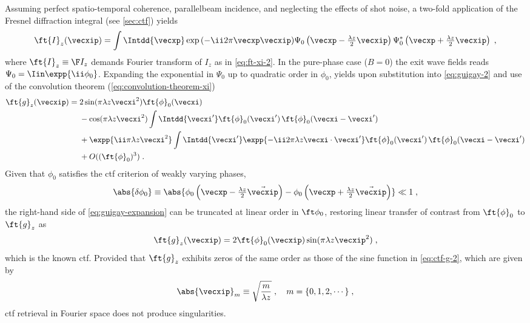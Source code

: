 \documentclass[
twoside,
openright,
titlepage,
numbers=noenddot,
headinclude,
fleqn,
a4paper,
footinclude=true,
cleardoublepage=empty,
abstractoff,
BCOR=5mm,
paper=a4,
fontsize=11pt,
british,ngerman,american,
]{scrreprt}
\begin{document}
Assuming perfect spatio-temporal coherence, parallel\hyph beam
incidence, and neglecting the effects of shot noise, a two-fold
application of the Fresnel diffraction integral (see \cref{sec:ctf})
yields
\begin{equation}
  \label{eq:guigay-2}
  \begin{split}
    \ft{I}_z(\vecxip) = 
    \int \Intdd{\vecxp}\exp{(-\ii 2\pi\vecxp\vecxip)} 
    \Psi_0\left(\vecxp-\tfrac{\lambda z}{2}\vecxip\right) 
    \Psi^*_0\left(\vecxp+\tfrac{\lambda z}{2}\vecxip\right)\;,
  \end{split}
\end{equation}
where $\ft{I}_z\equiv\F I_z$ demands Fourier transform of $I_z$ as in
\cref{eq:ft-xi-2}.  In the pure-phase case ($B=0$) the exit wave
fields reads $\Psi_0=\Iin\expp{\ii\phi_0}$.  Expanding the exponential
in $\Psi_0$ up to quadratic order in $\phi_0$, yields upon
substitution into \cref{eq:guigay-2} and use of the convolution
theorem (\cref{eq:convolution-theorem-xi})
\begin{equation}
  \label{eq:guigay-expansion}
    \begin{split}
      \ft{g}_z(\vecxip) ={}& 
      2\sin(\pi\lambda z\vecxi^2)\ft{\phi}_0(\vecxi) 
    \\ &  -\cos(\pi\lambda z\vecxi^2)\int\Intdd{\vecxi'}
      \ft{\phi}_0(\vecxi')\,\ft{\phi}_0(\vecxi-\vecxi')
    \\ & +\expp{\ii\pi\lambda z\vecxi^2}\int\Intdd{\vecxi'}
    \expp{-\ii 2\pi\lambda z\vecxi\cdot\vecxi'} 
    \ft{\phi}_0(\vecxi')\,\ft{\phi}_0(\vecxi-\vecxi')
    \\ & +O( ( \ft{\phi}_0 )^3 ) \;.
  \end{split}
\end{equation}
Given that $\phi_0$ satisfies the \ac{ctf} criterion of weakly varying
phases, %
\begin{equation}
  \label{eq:weak-phase-2}
  \abs{\delta\phi_0}\equiv\abs{
    \phi_0\left(\vecxp-\tfrac{\lambda z}{2}\vec{\vecxip}\right)
    - \phi_0\left(\vecxp+\tfrac{\lambda z}{2}\vec{\vecxip}\right)}
  \ll 1\;,
\end{equation}
the right-hand side of \cref{eq:guigay-expansion} can be truncated at
linear order in $\ft\phi_0$, restoring linear transfer of contrast
from $\ft{\phi}_0$ to $\ft{g}_z$ as
\begin{equation}
  \label{eq:ctf-g-2}
    \ft{g}_z(\vecxip) =
     2\ft{\phi}_0(\vecxip)\sin(\pi\lambda z\vecxip^2) \;,
\end{equation}
which is the known \acf{ctf}.  Provided that $\ft{g}_z$ exhibits zeros
of the same order as those of the sine function in \cref{eq:ctf-g-2},
which are given by
\begin{equation}
  \label{eq:sine-zeros}
  \abs{\vecxip}_m\equiv\sqrt{\frac{m}{\lambda z}} \;, 
  \quad m=\{0,1,2,\cdots\} \;,
\end{equation}
\ac{ctf} retrieval in Fourier space does not produce singularities.
\end{document}
